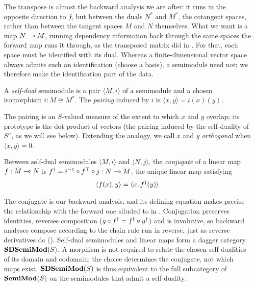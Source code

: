The transpose is almost the backward analysis we are after: it runs in the opposite direction to $f$, but
between the duals $N^*$ and $M^*$, the cotangent spaces, rather than between the tangent spaces $M$ and $N$
themselves. What we want is a map $N \multimap M$, running dependency information back through the same spaces
the forward map runs it through, as the transposed matrix did in . For that, each space
must be identified with its dual. Whereas a finite-dimensional vector space always admits such an
identification (choose a basis), a semimodule need not; we therefore make the identification part of the data.
\begin{definition}
  \label{def:self-dual-semimodule}
  A \emph{self-dual} semimodule is a pair $\langle M, i \rangle$ of a semimodule and a chosen isomorphism
  $i : M \cong M^*$. The \emph{pairing} induced by $i$ is $\langle x, y \rangle = i(x)(y)$.
\end{definition}
The pairing is an $S$-valued measure of the extent to which $x$ and $y$ overlap; its prototype is the
dot product of vectors (the pairing induced by the self-duality of $S^n$, as we will see below). Extending the
analogy, we call $x$ and $y$ \emph{orthogonal} when $\langle x, y \rangle = 0$.
\begin{definition}[Conjugate]
  \label{def:conjugate}
  Between self-dual semimodules $\langle M, i \rangle$ and $\langle N, j \rangle$, the \emph{conjugate} of
  a linear map $f : M \multimap N$ is $f^{\dagger} = i^{-1} \circ f^{\top} \circ j : N \multimap M$, the
  unique linear map satisfying
  \begin{displaymath}
    \langle f(x), y \rangle = \langle x, f^{\dagger}(y) \rangle
  \end{displaymath}
\end{definition}
The conjugate is our backward analysis, and its defining equation makes precise the relationship with
the forward one alluded to in . Conjugation preserves identities, reverses
composition ($g \circ f^{\dagger} = f^{\dagger} \circ g^{\dagger}$) and is involutive, so backward analyses compose
according to the chain rule run in reverse, just as reverse derivatives do (). Self-dual
semimodules and linear maps form a dagger category $\mathbf{SDSemiMod}(S)$. A morphism is not
required to relate the chosen self-dualities of its domain and codomain; the choice determines the
conjugate, not which maps exist. $\mathbf{SDSemiMod}(S)$ is thus equivalent to the full subcategory of
$\mathbf{SemiMod}(S)$ on the semimodules that admit a self-duality.


